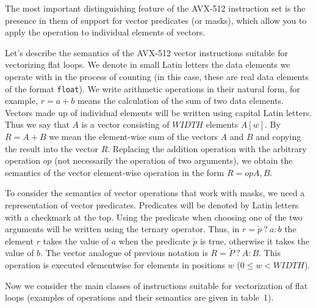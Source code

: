 \documentclass[
11pt,%
tightenlines,%
twoside,%
onecolumn,%
nofloats,%
nobibnotes,%
nofootinbib,%
superscriptaddress,%
noshowpacs,%
centertags]%
{revtex4}
\begin{document}
The most important distinguishing feature of the AVX-512 instruction set is the presence in them of support for vector predicates (or masks), which allow you to apply the operation to individual elements of vectors.

Let's describe the semantics of the AVX-512 vector instructions suitable for vectorizing flat loops.
We denote in small Latin letters the data elements we operate with in the process of counting (in this case, these are real data elements of the format \texttt{float}).
We write arithmetic operations in their natural form, for example, $r = a + b$ means the calculation of the sum of two data elements.
Vectors made up of individual elements will be written using capital Latin letters.
Thus we say that $A$ is a vector consisting of $WIDTH$ elements $A[w]$.
By $R = A + B$ we mean the element-wise sum of the vectors $A$ and $B$ and copying the result into the vector $R$.
Replacing the addition operation with the arbitrary operation $op$ (not necessarily the operation of two arguments), we obtain the semantics of the vector element-wise operation in the form $R = op A, B$.

To consider the semantics of vector operations that work with masks, we need a representation of vector predicates.
Predicates will be denoted by Latin letters with a checkmark at the top.
Using the predicate when choosing one of the two arguments will be written using the ternary operator.
Thus, in $r = \check{p} \ ? \ a : b$ the element $r$ takes the value of $a$ when the predicate $\check{p}$ is true, otherwise it takes the value of $b$.
The vector analogue of previous notation is $R = \check{P} \ ? \ A : B$.
This operation is executed elementwise for elements in positions $w$ ($0 \le w < WIDTH$).

Now we consider the main classes of instructions suitable for vectorization of flat loops (examples of operations and their semantics are given in table~1).
\end{document}
